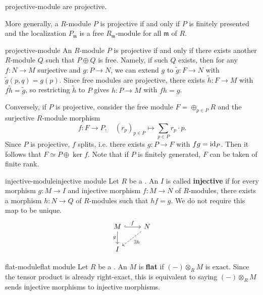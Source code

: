 \begin{example}{projective-module}
     are projective.
    
    More generally, a  $R$-module $P$ is projective if and only if $P$ is finitely presented and the localization $P_\mathfrak{m}$ is a free $R_\mathfrak{m}$-module for all  $\mathfrak{m}$ of $R$.
\end{example}

\begin{example}{projective-module}
    An $R$-module $P$ is projective if and only if there exists another $R$-module $Q$ such that $P \oplus Q$ is free. Namely, if such $Q$ exists, then for any $f : N \to M$ surjective and $g : P \to N$, we can extend $g$ to $\tilde{g} : F \to N$ with $\tilde{g}(p, q) = g(p)$. Since free modules are projective, there exists $\tilde{h} : F \to M$ with $f \tilde{h} = \tilde{g}$, so restricting $\tilde{h}$ to $P$ gives $h : P \to M$ with $fh = g$.
    
    Conversely, if $P$ is projective, consider the free module $F = \oplus_{p \in P} R$ and the surjective $R$-module morphism
    \[ f : F \to P, \quad (r_p)_{p \in P} \mapsto \sum_{p \in P} r_p \cdot p . \]
    Since $P$ is projective, $f$ splits, i.e. there exists $g : P \to F$ with $fg = \text{id}_P$. Then it follows that $F \simeq P \oplus \ker f$. Note that if $P$ is finitely generated, $F$ can be taken of finite rank.
\end{example}

\begin{topic}{injective-module}{injective module}
    Let $R$ be a . An  $I$ is called \textbf{injective} if for every morphism $g : M \to I$ and injective morphism $f : M \to N$ of $R$-modules, there exists a morphism $h : N \to Q$ of $R$-modules such that $hf = g$. We do not require this map to be unique.
    \[ \begin{tikzcd} M \arrow[hookrightarrow]{r}{f} \arrow[swap]{d}{g} & N \arrow[dashed]{ld}{\exists h} \\ I & \end{tikzcd} \]
\end{topic}

\begin{topic}{flat-module}{flat module}
    Let $R$ be a . An  $M$ is \textbf{flat} if $(-) \otimes_R M$ is exact. Since the tensor product is already right-exact, this is equivalent to saying $(-) \otimes_R M$ sends injective morphisms to injective morphisms.
\end{topic}


